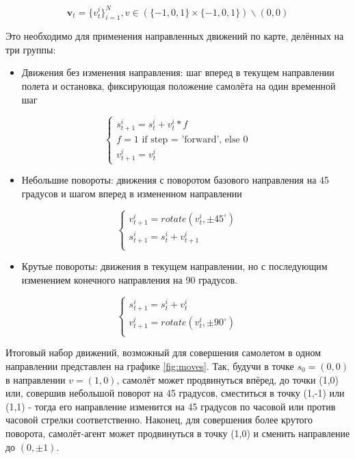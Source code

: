 \begin{equation}
    \textbf{v}_t = \{v^i_t\}^N_{i=1}, v \in (\{-1,0,1\} \times \{-1, 0, 1\})\backslash(0,0)
\end{equation}

Это необходимо для применения направленных движений по карте, делённых на три группы:

\begin{itemize}
\item Движения без изменения направления: шаг вперед в текущем направлении полета и остановка,
  фиксирующая положение самолёта на один временной шаг
\end{itemize}
\begin{equation}
    \begin{cases}
        s^i_{t+1} = s^i_{t} + v^i_t * f \\
        f = 1 \text{ if step = 'forward', else } 0 \\
        v^i_{t+1} = v^i_{t}
    \end{cases}
\end{equation}
\begin{itemize}
\item Небольшие повороты: движения с поворотом базового направления на 45 градусов и
  шагом вперед в измененном направлении
\end{itemize}
\begin{equation}
    \begin{cases}
        v^i_{t+1} = rotate(v^i_{t}, \pm 45^{\circ}) \\ 
        s^i_{t+1} = s^i_{t} + v^i_{t+1}\\
    \end{cases}
\end{equation}
\begin{itemize}
\item Крутые повороты: движения в текущем направлении, но с последующим изменением конечного направления 
 на 90 градусов.
\end{itemize}
\begin{equation}
    \begin{cases}
        s^i_{t+1} = s^i_{t} + v^i_{t}\\
        v^i_{t+1} = rotate(v^i_{t}, \pm 90^{\circ}) \\
    \end{cases}    
\end{equation}

Итоговый набор движений, возможный для совершения самолетом в одном направлении представлен на графике \ref{fig:moves}.
Так, будучи в точке $s_0 = (0,0)$ в направлении $v = (1,0)$, самолёт может продвинуться впёред, до точки (1,0) или, 
совершив небольшой поворот на 45 градусов, сместиться в точку (1,-1) или (1,1) - тогда его направление изменится
на 45 градусов по часовой или против часовой стрелки соответственно.
Наконец, для совершения более крутого поворота, самолёт-агент может продвинуться в точку (1,0) и сменить направление
до $(0,\pm 1)$. 

